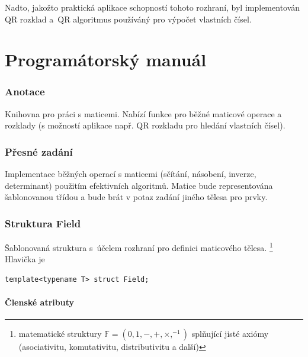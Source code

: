 \documentclass[11pt,a4paper]{article}
\theoremstyle{remark}
\begin{document}
Nadto, jakožto praktická aplikace schopností tohoto rozhraní, byl implementován
QR rozklad a~QR algoritmus používáný pro výpočet vlastních čísel.

\pagebreak

\part{Programátorský manuál}
\section{Anotace}
Knihovna pro práci s maticemi.
Nabízí funkce pro běžné maticové operace a rozklady (s možností aplikace např.
QR rozkladu pro hledání vlastních čísel).

\section{Přesné zadání}
Implementace běžných operací s maticemi (sčítání, násobení, inverze,
determinant) použitím efektivních algoritmů. 
Matice bude representována ša\-blo\-no\-va\-nou třídou a bude brát v potaz
zadání jiného tělesa pro prvky.

\section{Struktura Field}

Šablonovaná struktura s~účelem rozhraní pro definici maticového
tělesa.\thinspace%
\footnote{matematické struktury $\mathbb{F} = (0, 1, -, +, \times, ^{-1})$
splňující jisté axiómy (asociativitu, komutativitu, distributivitu a další)}
Hlavička je
\begin{verbatim}
template<typename T> struct Field;
\end{verbatim}

\subsection{Členské atributy}
\end{document}
